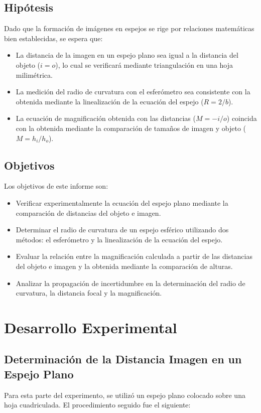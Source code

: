 \documentclass[article,12pt]{elsarticle}
\begin{document}
\subsection{Hipótesis}

Dado que la formación de imágenes en espejos se rige por relaciones matemáticas bien establecidas, se espera que:
\begin{itemize}
    \item La distancia de la imagen en un espejo plano sea igual a la distancia del objeto ($i = o$), lo cual se verificará mediante triangulación en una hoja milimétrica.
    \item La medición del radio de curvatura con el esferómetro sea consistente con la obtenida mediante la linealización de la ecuación del espejo ($R = 2/b$).
    \item La ecuación de magnificación obtenida con las distancias ($M = -i/o$) coincida con la obtenida mediante la comparación de tamaños de imagen y objeto ($M = h_i/h_o$).
\end{itemize}


\subsection{Objetivos}

Los objetivos de este informe son:
\begin{itemize}
    \item Verificar experimentalmente la ecuación del espejo plano mediante la comparación de distancias del objeto e imagen.
    \item Determinar el radio de curvatura de un espejo esférico utilizando dos métodos: el esferómetro y la linealización de la ecuación del espejo.
    \item Evaluar la relación entre la magnificación calculada a partir de las distancias del objeto e imagen y la obtenida mediante la comparación de alturas.
    \item Analizar la propagación de incertidumbre en la determinación del radio de curvatura, la distancia focal y la magnificación.
\end{itemize}


\section{Desarrollo Experimental}
\subsection{Determinación de la Distancia Imagen en un Espejo Plano}
Para esta parte del experimento, se utilizó un espejo plano colocado sobre una hoja cuadriculada. El procedimiento seguido fue el siguiente:
\end{document}
